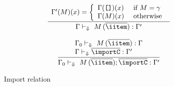 \begin{figure}
\[ \begin{array}{cc}
	\displaystyle\frac
	 {\begin{array}{ll}
            \Gamma'(M)(x) = \left\{ \begin{array}{ll}
                \Gamma(\texttt{[]})(x) & \text{ if } M = \gamma\\
                \Gamma(M)(x)           & \text{ otherwise}
             \end{array}\right.
          \end{array}}
	 {\Gamma \vdash_{\Downarrow} \ M\, (\overline{\iitem}) : \Gamma'} \\ \\

	\displaystyle\frac
	 {\begin{array}{ll}
	   \Gamma_0 \vdash_{\Downarrow} \ M\, (\overline{\iitem}) : \Gamma \\
           \Gamma \vdash_{\Downarrow} \overline{\importC} : \Gamma'
          \end{array}}
	 {\Gamma_0 \vdash_{\Downarrow} \ M\, (\overline{\iitem}); \overline{\importC} : \Gamma'} 
\end{array} \]
\caption{Import relation}
\label{fig:import-relation}
\end{figure}

